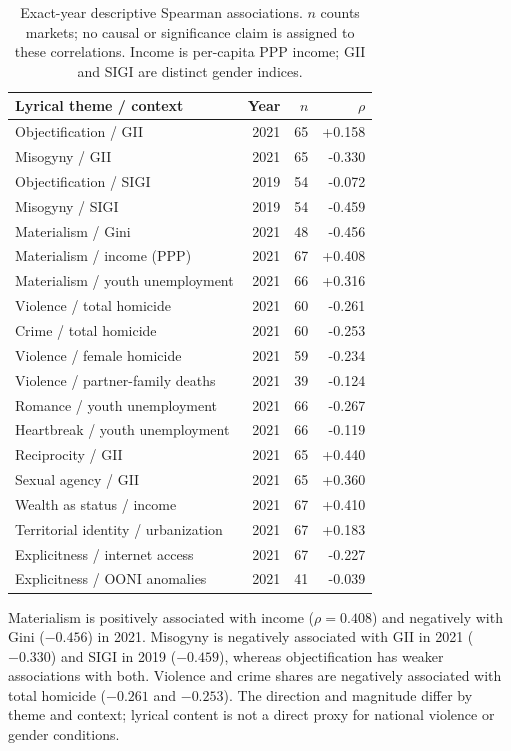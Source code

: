 \documentclass[10pt,a4paper,twocolumn]{article}
\begin{document}
\begin{table}[t]
\caption{Exact-year descriptive Spearman associations. $n$ counts markets; no causal or significance claim is assigned to these correlations. Income is per-capita PPP income; GII and SIGI are distinct gender indices.}
\label{tab:context}
\centering\scriptsize\setlength{\tabcolsep}{3pt}
\begin{tabularx}{\columnwidth}{@{}Xrrr@{}}
\toprule Lyrical theme / context & Year & $n$ & $\rho$ \\
\midrule
Objectification / GII & 2021 & 65 & +0.158 \\
Misogyny / GII & 2021 & 65 & -0.330 \\
Objectification / SIGI & 2019 & 54 & -0.072 \\
Misogyny / SIGI & 2019 & 54 & -0.459 \\
Materialism / Gini & 2021 & 48 & -0.456 \\
Materialism / income (PPP) & 2021 & 67 & +0.408 \\
Materialism / youth unemployment & 2021 & 66 & +0.316 \\
Violence / total homicide & 2021 & 60 & -0.261 \\
Crime / total homicide & 2021 & 60 & -0.253 \\
Violence / female homicide & 2021 & 59 & -0.234 \\
Violence / partner-family deaths & 2021 & 39 & -0.124 \\
Romance / youth unemployment & 2021 & 66 & -0.267 \\
Heartbreak / youth unemployment & 2021 & 66 & -0.119 \\
Reciprocity / GII & 2021 & 65 & +0.440 \\
Sexual agency / GII & 2021 & 65 & +0.360 \\
Wealth as status / income & 2021 & 67 & +0.410 \\
Territorial identity / urbanization & 2021 & 67 & +0.183 \\
Explicitness / internet access & 2021 & 67 & -0.227 \\
Explicitness / OONI anomalies & 2021 & 41 & -0.039 \\
\bottomrule
\end{tabularx}
\end{table}

Materialism is positively associated with income ($\rho=0.408$) and negatively with Gini ($-0.456$) in 2021. Misogyny is negatively associated with GII in 2021 ($-0.330$) and SIGI in 2019 ($-0.459$), whereas objectification has weaker associations with both. Violence and crime shares are negatively associated with total homicide ($-0.261$ and $-0.253$). The direction and magnitude differ by theme and context; lyrical content is not a direct proxy for national violence or gender conditions.
\end{document}
